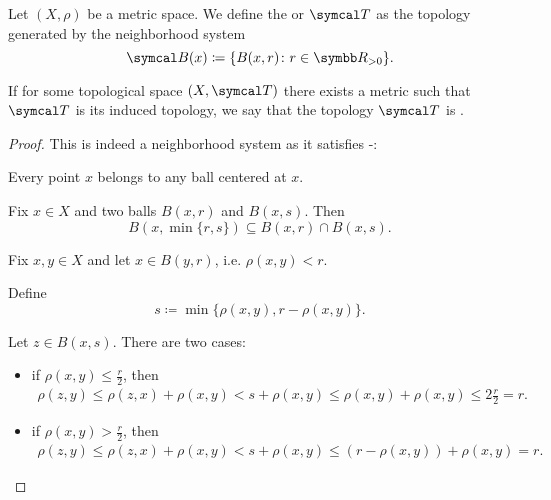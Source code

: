 \begin{definition}\label{def:metric_topology}\cite[249]{Engelking1989}
  Let \( (X, \rho) \) be a metric space. We define the  or  \( \Cal{T} \) as the topology generated by the neighborhood system
  \begin{equation*}
    \Cal{B}(x) \coloneqq \{ B(x, r) \colon r \in \BR_{>0} \}.
  \end{equation*}

  If for some topological space \( (X, \Cal{T}) \) there exists a metric such that \( \Cal{T} \) is its induced topology, we say that the topology \( \Cal{T} \) is .
\end{definition}
\begin{proof}
  This is indeed a neighborhood system as it satisfies -:

  \begin{description}
     Every point \( x \) belongs to any ball centered at \( x \).

     Fix \( x \in X \) and two balls \( B(x, r) \) and \( B(x, s) \). Then
    \begin{equation*}
      B(x, \min\{ r, s \}) \subseteq B(x, r) \cap B(x, s).
    \end{equation*}

     Fix \( x, y \in X \) and let \( x \in B(y, r) \), i.e. \( \rho(x, y) < r \).

    Define
    \begin{equation*}
      s \coloneqq \min\{ \rho(x, y), r - \rho(x, y) \}.
    \end{equation*}

    Let \( z \in B(x, s) \). There are two cases:
    \begin{itemize}
      \item if \( \rho(x, y) \leq \tfrac r 2 \), then
      \begin{align*}
        \rho(z, y)
        \leq
        \rho(z, x) + \rho(x, y)
        <
        s + \rho(x, y)
        \leq
        \rho(x, y) + \rho(x, y)
        \leq
        2 \tfrac r 2
        =
        r.
      \end{align*}

      \item if \( \rho(x, y) > \tfrac r 2 \), then
      \begin{align*}
        \rho(z, y)
        \leq
        \rho(z, x) + \rho(x, y)
        <
        s + \rho(x, y)
        \leq
        (r - \rho(x, y)) + \rho(x, y)
        =
        r.
      \end{align*}
    \end{itemize}


\end{description}
\end{proof}
